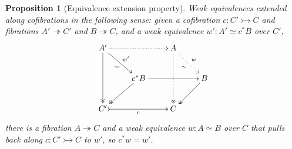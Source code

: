 \documentclass[11pt,reqno]{amsart}
\newcommand{\mono}{\ensuremath{\rightarrowtail}}
\newcommand{\onto}{\ensuremath{\twoheadrightarrow}}
\newtheorem{proposition}[theorem]{Proposition}
\theoremstyle{remark}
\theoremstyle{definition}
\begin{document}
\begin{proposition}[Equivalence extension property]\label{prop:EEP}
Weak equivalences extended along cofibrations in the following sense: given a cofibration $c:C' \mono C$ and fibrations $A'\onto C'$ and $B\onto C$, and a weak equivalence $w':A' \simeq c^*B$ over $C'$,
\begin{equation}\label{diag:EEP}
\xymatrix{
A' \ar@{->>}[dd] \ar[rd]_{\sim}^{w'} \ar@{..>}[rr] && A \ar@{..>>}[dd] \ar@{..>}[rd]_{\sim}^{w} \\
& c^*B \ar@{->>}[ld] \ar[rr]  && B \ar@{->>}[ld] \\
C' \ar@{>->}[rr]_c && C
}
\end{equation}
there is a fibration $A\onto C$ and a weak equivalence $w: A \simeq B$ over $C$ that pulls back along $c:C' \mono C$ to $w'$, so $c^*w = w'$.

\end{proposition}
%
\end{document}

